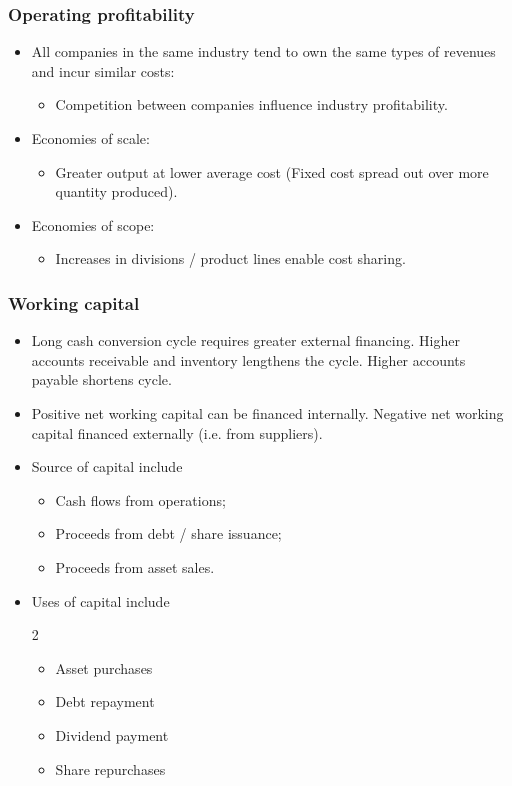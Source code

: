 \documentclass[../notes_compiled.tex]{subfiles}
\begin{document}
\subsubsection{Operating profitability}
\begin{itemize}
\item All companies in the same industry tend to own the same types of revenues and incur similar costs:
\begin{itemize}
\item Competition between companies influence industry profitability.
\end{itemize}
\item Economies of scale:
\begin{itemize}
\item Greater output at lower average cost (Fixed cost spread out over more quantity produced).
\end{itemize}
\item Economies of scope:
\begin{itemize}
\item Increases in divisions / product lines enable cost sharing.
\end{itemize}
\end{itemize}

\subsubsection{Working capital}
\begin{itemize}
\item Long cash conversion cycle requires greater external financing. Higher accounts receivable and inventory lengthens the cycle. Higher accounts payable shortens cycle.
\item Positive net working capital can be financed internally. Negative net working capital financed externally (i.e. from suppliers).
\item Source of capital include
\begin{itemize}
\item Cash flows from operations;
\item Proceeds from debt / share issuance;
\item Proceeds from asset sales.
\end{itemize}
\item Uses of capital include
\begin{multicols}{2}
\begin{itemize}
\item Asset purchases
\item Debt repayment
\item Dividend payment
\item Share repurchases
\end{itemize}
\end{multicols}
\end{itemize}
\end{document}

